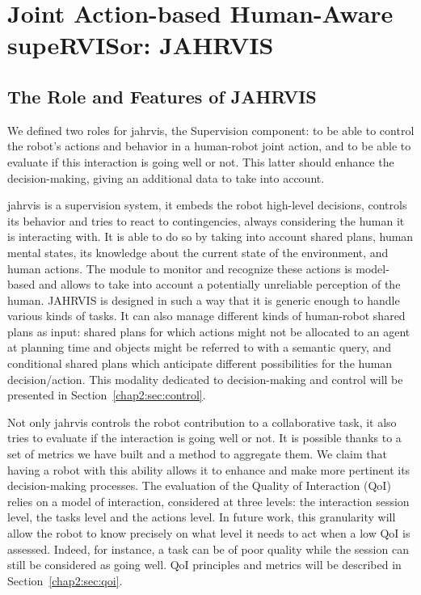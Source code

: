 \documentclass[a4paper,11pt,twoside]{StyleThese}
\begin{document}
\setcounter{chapter}{1} %
\dominitoc
\faketableofcontents
\fi

\chapter{Joint Action-based Human-Aware supeRVISor: JAHRVIS}
\label{chapter:chap2}
\minitoc

\section{The Role and Features of JAHRVIS}\label{chap2:sec:sup_features}

We defined two roles for \acrfull{jahrvis}, the Supervision component: to be able to control the robot's actions and behavior in a human-robot joint action, and to be able to evaluate if this interaction is going well or not. This latter should enhance the decision-making, giving an additional data to take into account. 

\acrshort{jahrvis} is a supervision system, \ie it embeds the robot high-level decisions, controls its behavior and tries to react to contingencies, always considering the human it is interacting with. It is able to do so by taking into account shared plans, human mental states, its knowledge about the current state of the environment, and human actions. The module to monitor and recognize these actions is model-based and allows to take into account a potentially unreliable perception of the human. JAHRVIS is designed in such a way that it is generic enough to handle various kinds of tasks. It can also manage  different kinds of human-robot shared plans as input: shared plans for which actions might not be allocated to an agent at planning time and objects might be referred to with a semantic query, and conditional shared plans which anticipate different possibilities for the human decision/action. This modality dedicated to decision-making and control will be presented in Section~\ref{chap2:sec:control}.

Not only \acrshort{jahrvis} controls the robot contribution to a collaborative task, it also tries to evaluate if the interaction is going well or not. It is possible thanks to a set of metrics we have built and a method to aggregate them. We claim that having a robot with this ability allows it to enhance and make more pertinent its decision-making processes. The evaluation of the Quality of Interaction (QoI) relies on a model of interaction, considered at  three levels: the interaction session level, the tasks level and the actions level. In future work, this granularity will allow the robot to know precisely on what level it needs to act when a low QoI is assessed. Indeed, for instance, a task can be of poor quality while the session can still be considered as going well. QoI principles and metrics will be described in Section~\ref{chap2:sec:qoi}.
\end{document}
